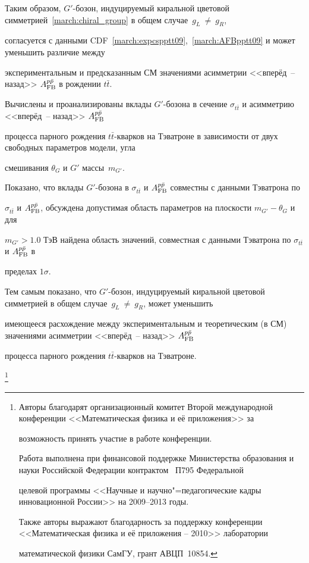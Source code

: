 Таким образом, $G'$-бозон, индуцируемый киральной цветовой симметрией~\eqref{march:chiral_group} в общем случае~$g_L~\neq~g_R$,

согласуется с данными CDF~\eqref{march:expcspptt09},~\eqref{march:AFBpptt09} и может уменьшить различие между

экспериментальным и предсказанным СМ значениями асимметрии <<вперёд~-- назад>>  $A_{\rm FB}^{p \bar p}$ в рождении $t\bar{t}$.




Вычислены и проанализированы вклады $G'$-бозона в сечение $\sigma_{t\bar{t}}$ и асимметрию <<вперёд~-- назад>> $A_{\rm FB}^{p \bar p}$

процесса парного рождения $t\bar{t}$-кварков на Тэватроне в за\-ви\-си\-мос\-ти от двух свободных параметров модели, угла

смешивания  $\theta_G$ и $G'$ массы~$m_{G'}$.



Показано, что вклады  $G'$-бозона в $\sigma_{t\bar{t}}$ и $A_{\rm FB}^{p \bar p}$ совместны с данными Тэватрона по

$\sigma_{t\bar{t}}$ и $A_{\rm FB}^{p \bar p}$, обсуждена допустимая область параметров на плоскости $m_{G'} - \theta_G$ и для

$m_{G'}>1.0$ ТэВ найдена область значений, совместная с данными Тэватрона по  $\sigma_{t\bar{t}}$ и $A_{\rm FB}^{p \bar p}$ в

пределах $1 \sigma$.



Тем самым показано, что $G'$-бозон, индуцируемый киральной цветовой симметрией в общем случае~$g_L~\neq~g_R$, может уменьшить

имеющееся расхож\-де\-ние между экспериментальным и теоретическим (в СМ) значениями асимметрии <<вперёд~-- назад>> $A_{\rm FB}^{p \bar p}$

процесса парного рождения $t\bar{t}$-кварков на Тэватроне.



\thanks{Авторы благодарят организационный комитет Второй международной кон\-фе\-рен\-ции <<Математическая физика и её приложения>> за

возможность принять участие в работе кон\-фе\-рен\-ции.



Работа выполнена при финансовой поддержке Министерства образования и науки Российской Федерации контрактом \No\ П795 Федеральной

целевой программы <<Научные и научно"=педагогические кадры инновационной России>> на 2009--2013 годы.





Также авторы выражают благодарность за поддержку конференции <<Математическая физика и её приложения – 2010>> лаборатории

математической физики СамГУ, грант АВЦП~10854.}






